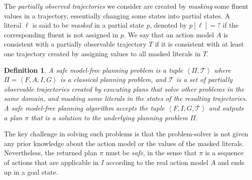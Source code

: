 \documentclass[letterpaper]{article} %
\newcommand{\tuple}[1]{\ensuremath{\left \langle #1 \right \rangle }}
\newcommand{\unobserved}{\textit{?}}
\newtheorem{definition}{Definition}
\begin{document}

The \emph{partially observed trajectories} we consider are created by \emph{masking} some fluent values in a trajectory, essentially changing some states into partial states. 
A literal $\ell$ is said to be \emph{masked} in a partial state $p$, denoted by $p[\ell]=\unobserved$ if the corresponding fluent is not assigned in $p$. 
We say that an action model $A$ is consistent with a partially observable trajectory $T$ if 
it is consistent with at least one trajectory created by assigning values to all masked literals in $T$.  
\begin{definition}
A safe model-free planning problem is a tuple $\tuple{\Pi, \mathcal{T}}$ 
where $\Pi=\tuple{F,A,I,G}$ is a classical planning problem, 
and $\mathcal{T}$ is a set of partially observable trajectories created by 
executing plans that solve other problems in the same domain, %
and masking some literals in the states of the resulting trajectories.  
A safe model-free planning algorithm accepts the tuple $\tuple{F,I,G,\mathcal{T}}$ and outputs a plan $\pi$ that is a solution to the underlying planning problem $\Pi$. 
\label{def:theProblem}
\end{definition}
The key challenge in solving such problems is that the problem-solver is not given any prior knowledge about the action model or the values of the masked literals. 
Nevertheless, the returned plan $\pi$ must be \emph{safe}, in the sense that $\pi$ is a sequence of actions that are applicable in $I$ according to the real action model $A$ and ends up in a goal state. 
\end{document}
